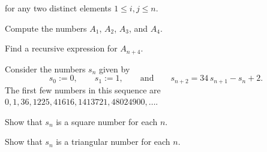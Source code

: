 \begin{challenge}
\begin{equation*}
  \end{equation*}
  for any two distinct elements $1\leq i,j\leq n$.
  \begin{subexenum}
  \item Compute the numbers $A_1$, $A_2$, $A_3$, and $A_4$.
  \item Find a recursive expression for $A_{n+4}$.
  \end{subexenum}
  \exercise Consider the numbers $s_n$ given by
  \begin{equation*}
    s_0:=0,\qquad s_1:=1,\qquad\text{and}\qquad s_{n+2}=34\,s_{n+1}-s_n+2.
  \end{equation*}
  The first few numbers in this sequence are $0,1,36,1225,41616, 1413721, 48024900,\ldots$.
  \begin{subexenum}
  \item Show that $s_n$ is a square number for each $n$.
  \item Show that $s_n$ is a triangular number for each $n$.
  \end{subexenum}
\end{challenge}


